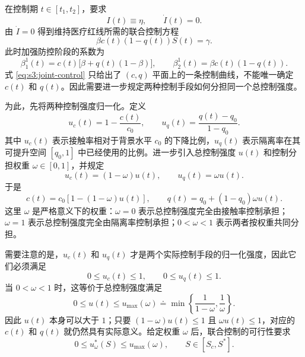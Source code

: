 在控制期 $t\in[t_1,t_2]$，要求
\begin{equation}
I(t)\equiv \eta,\qquad \dot I(t)=0.
\end{equation}
由 $\dot I=0$ 得到维持医疗红线所需的联合控制方程
\begin{equation}
\beta c(t)(1-q(t))S(t)=\gamma.
\label{eq:s3:joint-control}
\end{equation}
此时加强防控阶段的系数为
\begin{equation}
\beta_1^1(t)=c(t)\big[\beta+q(t)(1-\beta)\big],
\qquad
\beta_2^1(t)=\beta c(t)(1-q(t)).
\label{eq:s3:beta12-phase1}
\end{equation}
式 \eqref{eq:s3:joint-control} 只给出了 $(c,q)$ 平面上的一条控制曲线，不能唯一确定 $c(t)$ 和 $q(t)$。因此需要进一步规定两种控制手段如何分担同一个总控制强度。

为此，先将两种控制强度归一化。定义
\begin{equation}
u_c(t)=1-\frac{c(t)}{c_0},
\qquad
u_q(t)=\frac{q(t)-q_0}{1-q_0}.
\label{eq:s3:normalized-controls}
\end{equation}
其中 $u_c(t)$ 表示接触率相对于背景水平 $c_0$ 的下降比例，$u_q(t)$ 表示隔离率在其可提升空间 $[q_0,1]$ 中已经使用的比例。进一步引入总控制强度 $u(t)$ 和控制分担权重 $\omega\in[0,1]$，并规定
\begin{equation}
u_c(t)=(1-\omega)u(t),
\qquad
u_q(t)=\omega u(t).
\label{eq:s3:strict-weight}
\end{equation}
于是
\begin{equation}
c(t)=c_0[1-(1-\omega)u(t)],
\qquad
q(t)=q_0+(1-q_0)\omega u(t).
\label{eq:s3:cq-u}
\end{equation}
这里 $\omega$ 是严格意义下的权重：$\omega=0$ 表示总控制强度完全由接触率控制承担；$\omega=1$ 表示总控制强度完全由隔离率控制承担；$0<\omega<1$ 表示两者按权重共同分担。

需要注意的是，$u_c(t)$ 和 $u_q(t)$ 才是两个实际控制手段的归一化强度，因此它们必须满足
\begin{equation}
0\le u_c(t)\le 1,\qquad 0\le u_q(t)\le 1.
\end{equation}
当 $0<\omega<1$ 时，这等价于总控制强度满足
\begin{equation}
0\le u(t)\le
u_{\max}(\omega)
\doteq
\min\left\{\frac{1}{1-\omega},\frac{1}{\omega}\right\}.
\label{eq:s3:umax}
\end{equation}
因此 $u(t)$ 本身可以大于 $1$；只要 $(1-\omega)u(t)\le 1$ 且 $\omega u(t)\le 1$，对应的 $c(t)$ 和 $q(t)$ 就仍然具有实际意义。给定权重 $\omega$ 后，联合控制的可行性要求
\begin{equation}
0\le u_\omega^*(S)\le u_{\max}(\omega),
\qquad S\in [S_c,S^*].
\end{equation}

